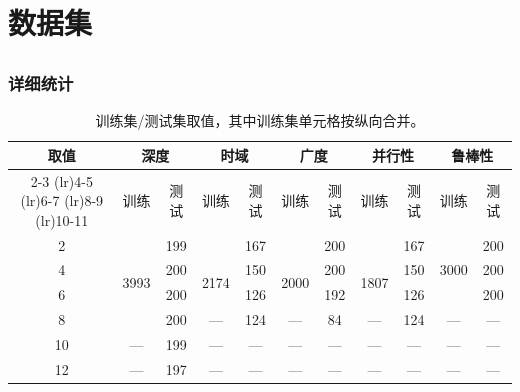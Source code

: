 \section{数据集}
\label{ap:dataset_detail}


\subsection{\ourbenchmark}


\subsubsection{详细统计}

\begin{table}[h]
\centering
\small
\setlength{\tabcolsep}{6pt}
\begin{tabular}{c cc cc cc cc cc}
\toprule
\multirow{2}{*}{\textbf{取值}}
& \multicolumn{2}{c}{\textbf{深度}}
& \multicolumn{2}{c}{\textbf{时域}}
& \multicolumn{2}{c}{\textbf{广度}}
& \multicolumn{2}{c}{\textbf{并行性}}
& \multicolumn{2}{c}{\textbf{鲁棒性}} \\
\cmidrule(lr){2-3}
\cmidrule(lr){4-5}
\cmidrule(lr){6-7}
\cmidrule(lr){8-9}
\cmidrule(lr){10-11}
& 训练 & 测试
& 训练 & 测试
& 训练 & 测试
& 训练 & 测试
& 训练 & 测试 \\
\midrule

2  & \multirow{4}{*}{3993} & 199
   &                    & 167
   &                    & 200
   &                    & 167
   & \multirow{3}{*}{3000} & 200 \\

4  &                      & 200
   & \multirow{2}{*}{2174} & 150
   & \multirow{2}{*}{2000} & 200
   & \multirow{2}{*}{1807} & 150
   &                      & 200 \\

6  &                      & 200
   &                      & 126
   &                      & 192
   &                      & 126
   &                      & 200 \\

8  &                      & 200
   & ---                  & 124
   & ---                  & 84
   & ---                  & 124
   & ---                  & --- \\

10 & ---                  & 199
   & ---                  & ---
   & ---                  & ---
   & ---                  & ---
   & ---                  & --- \\

12 & ---                  & 197
   & ---                  & ---
   & ---                  & ---
   & ---                  & ---
   & ---                  & --- \\

\bottomrule
\end{tabular}
\caption{训练集/测试集取值，其中训练集单元格按纵向合并。}
\label{tab:mas_axes_multirow}
\end{table}


